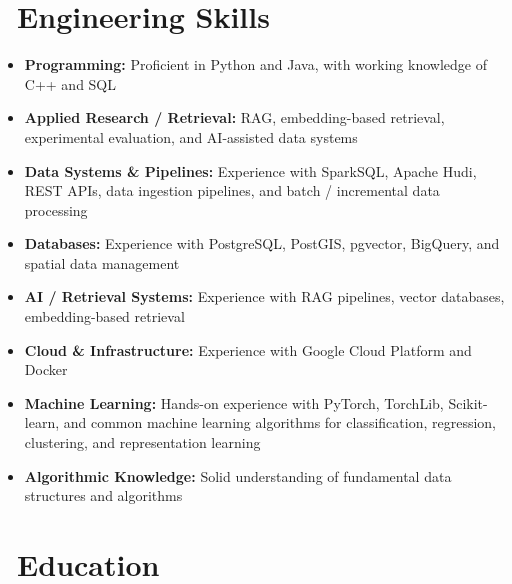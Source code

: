 \documentclass{resume}
\begin{document}
\section{\faCogs\ \textbf{Engineering Skills}}

\begin{itemize}[parsep=0.4ex]

\item \textbf{Programming:} Proficient in Python and Java, with working knowledge of C++ and SQL

\item \textbf{Applied Research / Retrieval:} RAG, embedding-based retrieval, experimental evaluation, and AI-assisted data systems

\item \textbf{Data Systems \& Pipelines:} Experience with SparkSQL, Apache Hudi, REST APIs, data ingestion pipelines, and batch / incremental data processing

\item \textbf{Databases:} Experience with PostgreSQL, PostGIS, pgvector, BigQuery, and spatial data management

\item \textbf{AI / Retrieval Systems:} Experience with RAG pipelines, vector databases, embedding-based retrieval

\item \textbf{Cloud \& Infrastructure:} Experience with Google Cloud Platform and Docker

\item \textbf{Machine Learning:} Hands-on experience with PyTorch, TorchLib, Scikit-learn, and common machine learning algorithms for classification, regression, clustering, and representation learning

  \item \textbf{Algorithmic Knowledge:} Solid understanding of fundamental data structures and algorithms
\end{itemize}

\section{\faGraduationCap\ \textbf{Education}}
\end{document}
